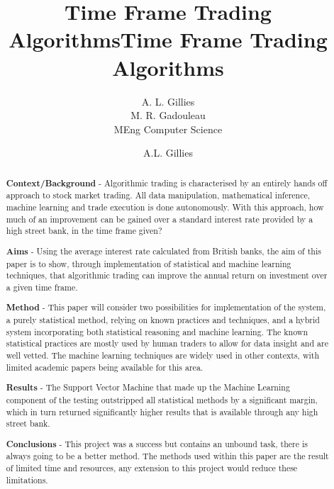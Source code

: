 \documentclass[conference]{IEEEtran}
\title{Time Frame Trading Algorithms}
\author{A. L. Gillies\\ M. R. Gadouleau\\ MEng Computer Science}
\title{Time Frame Trading Algorithms}
\author{A.L. Gillies}
\date{}
\begin{document}
\maketitle

\noindent
\begin{abstract}
\iffalse
The abstract must be a Structured Abstract with the headings {\bf Context/Background}, {\bf Aims}, {\bf Method}, {\bf Results}, and {\bf Conclusions}.  This section should not be longer than half of a page, and having no more than one or two sentences under each heading is advised.\\
\fi

{\bf Context/Background} - Algorithmic trading is characterised by an entirely hands off approach to stock market trading. All data manipulation, mathematical inference, machine learning and trade execution is done autonomously. With this approach, how much of an improvement can be gained over a standard interest rate provided by a high street bank, in the time frame given?

{\bf Aims} - Using the average interest rate calculated from British banks, the aim of this paper is to show, through implementation of statistical and machine learning techniques, that algorithmic trading can improve the annual return on investment over a given time frame.

{\bf Method} - This paper will consider two possibilities for implementation of the system, a purely statistical method, relying on known practices and techniques, and a hybrid system incorporating both statistical reasoning and machine learning. The known statistical practices are mostly used by human traders to allow for data insight and are well vetted. The machine learning techniques are widely used in other contexts, with limited academic papers being available for this area.

{\bf Results} - The Support Vector Machine that made up the Machine Learning component of the testing outstripped all statistical methods by a significant margin, which in turn returned significantly higher results that is available through any high street bank.

{\bf Conclusions} - This project was a success but contains an unbound task, there is always going to be a better method. The methods used within this paper are the result of limited time and resources, any extension to this project would reduce these limitations.
\end{abstract}

\iffalse
\begin{keywords}
Algorithmic, Machine Learning, Statistics, R, Trading, Stocks
\end{keywords}
\fi
\end{document}
